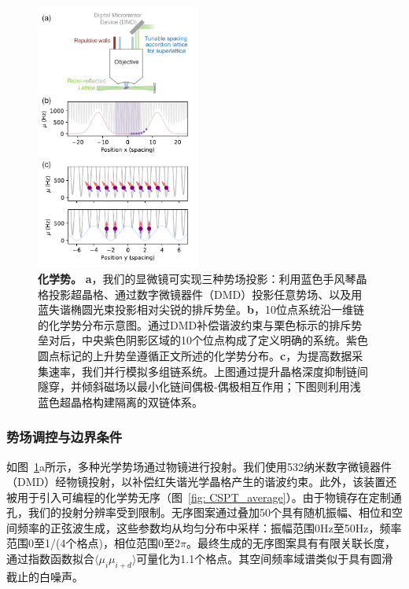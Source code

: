 \documentclass[preprint,superscriptaddress,floatfix,nofootinbib]{revtex4-2}
\begin{document}
\begin{figure}
    \centering
    \includegraphics[width=0.48\textwidth]{figures/chemical_potential.pdf}
    \caption{\textbf{化学势。} \textbf{a}，我们的显微镜可实现三种势场投影：利用蓝色手风琴晶格投影超晶格、通过数字微镜器件（DMD）投影任意势场、以及用蓝失谐椭圆光束投影相对尖锐的排斥势垒。\textbf{b}，10位点系统沿一维链的化学势分布示意图。通过DMD补偿谐波约束与栗色标示的排斥势垒对后，中央紫色阴影区域的10个位点构成了定义明确的系统。紫色圆点标记的上升势垒遵循正文所述的化学势分布。\textbf{c}，为提高数据采集速率，我们并行模拟多组链系统。上图通过提升晶格深度抑制链间隧穿，并倾斜磁场以最小化链间偶极-偶极相互作用；下图则利用浅蓝色超晶格构建隔离的双链体系。}
    \label{fig: chemical_potential}
\end{figure}
\subsubsection*{势场调控与边界条件}

如图~\ref{fig: chemical_potential}a所示，多种光学势场通过物镜进行投射。我们使用532纳米数字微镜器件（DMD）经物镜投射，以补偿红失谐光学晶格产生的谐波约束。此外，该装置还被用于引入可编程的化学势无序（图~\ref{fig: CSPT_average}）。由于物镜存在定制通孔，我们的投射分辨率受到限制。无序图案通过叠加50个具有随机振幅、相位和空间频率的正弦波生成，这些参数均从均匀分布中采样：振幅范围0Hz至50Hz，频率范围0至1/(4个格点)，相位范围0至$2\pi$。最终生成的无序图案具有有限关联长度，通过指数函数拟合$\langle\mu_i \mu_{i+d}\rangle$可量化为1.1个格点。其空间频率域谱类似于具有圆滑截止的白噪声。
\end{document}
